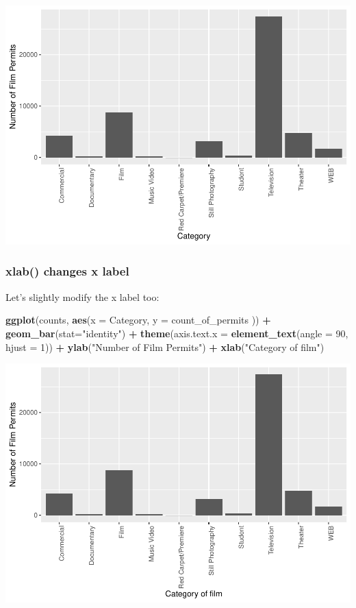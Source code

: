 \documentclass[
]{book}
\newenvironment{Shaded}{\begin{snugshade}}{\end{snugshade}}
\newcommand{\AttributeTok}[1]{\textcolor[rgb]{0.13,0.29,0.53}{#1}}
\newcommand{\DecValTok}[1]{\textcolor[rgb]{0.00,0.00,0.81}{#1}}
\newcommand{\FunctionTok}[1]{\textcolor[rgb]{0.13,0.29,0.53}{\textbf{#1}}}
\newcommand{\NormalTok}[1]{#1}
\newcommand{\SpecialCharTok}[1]{\textcolor[rgb]{0.81,0.36,0.00}{\textbf{#1}}}
\newcommand{\StringTok}[1]{\textcolor[rgb]{0.31,0.60,0.02}{#1}}
\begin{document}
\includegraphics{Statistics_Lab_files/figure-latex/1categoryC-1.pdf}

\hypertarget{xlab-changes-x-label}{%
\subsubsection{xlab() changes x label}\label{xlab-changes-x-label}}

Let's slightly modify the x label too:

\begin{Shaded}
\begin{Highlighting}[]
\FunctionTok{ggplot}\NormalTok{(counts, }\FunctionTok{aes}\NormalTok{(}\AttributeTok{x =}\NormalTok{ Category, }\AttributeTok{y =}\NormalTok{ count\_of\_permits )) }\SpecialCharTok{+}
  \FunctionTok{geom\_bar}\NormalTok{(}\AttributeTok{stat=}\StringTok{"identity"}\NormalTok{) }\SpecialCharTok{+} 
  \FunctionTok{theme}\NormalTok{(}\AttributeTok{axis.text.x =} \FunctionTok{element\_text}\NormalTok{(}\AttributeTok{angle =} \DecValTok{90}\NormalTok{, }\AttributeTok{hjust =} \DecValTok{1}\NormalTok{)) }\SpecialCharTok{+}
  \FunctionTok{ylab}\NormalTok{(}\StringTok{"Number of Film Permits"}\NormalTok{) }\SpecialCharTok{+} 
  \FunctionTok{xlab}\NormalTok{(}\StringTok{"Category of film"}\NormalTok{)}
\end{Highlighting}
\end{Shaded}

\includegraphics{Statistics_Lab_files/figure-latex/1categoryD-1.pdf}
\end{document}

